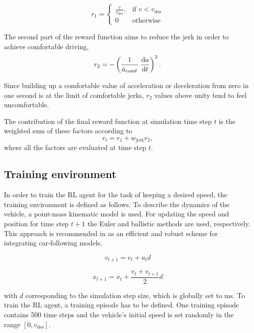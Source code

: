 \documentclass[review]{elsarticle}
\providecommand{\sub}[1]{_{\mathrm{#1}}}  %
\providecommand{\3}{{\ss}}
\begin{document}
\begin{equation}
	r_1  = 
	\begin{cases}
	\frac{v}{v\sub{des}},
	& \text{if } v < v\sub{des}\\
	0
	 & \text{otherwise}
	\end{cases}
\end{equation}

The second part of the reward function aims to reduce the jerk in
order to achieve comfortable driving, 
\begin{equation}
r_2 = -\left(\frac{1}{\dot{a}\sub{comf}} \ \dv{a}{t}\right)^2.
\end{equation}

Since building up a comfortable value of acceleration or deceleration
from zero in one second is at the limit of comfortable jerks, $r_2$
values above unity tend to feel uncomfortable.


The contribution of the final reward function at simulation time step $t$ is the weighted
sum of these factors according to
\begin{equation}
\label{rt1}
r_t =r_1 + w\sub{jerk} r_2,
\end{equation}
where all the factors are evaluated at time step $t$. 


\subsection{Training environment}
\label{training_environment1}
In order to train the RL agent for the task of keeping a desired
speed, the training environment is defined as follows. To describe the
dynamics of the vehicle, a point-mass kinematic model is used. For
updating the speed and position for time step $t + 1$ the Euler and
ballistic methods are used, respectively. This approach is recommended in \cite{numericalUpdateMethodsTreiber} as an efficient
and robust scheme for integrating car-following models.

\begin{equation}
	v_{t+1} = v_{t} + a_{t} d
\end{equation}

\begin{equation}
x_{t+1} = x_{t} + \frac{v_{t} + v_{t+1}}{2} d
\end{equation}


with $d$ corresponding to the simulation step size, which is globally
set to \unit[100]{ms}. To train the RL agent, a training episode has to be defined. One training episode contains 500 time steps and the vehicle's initial speed is set randomly in the range $[0,v\sub{des}]$.
\end{document}

